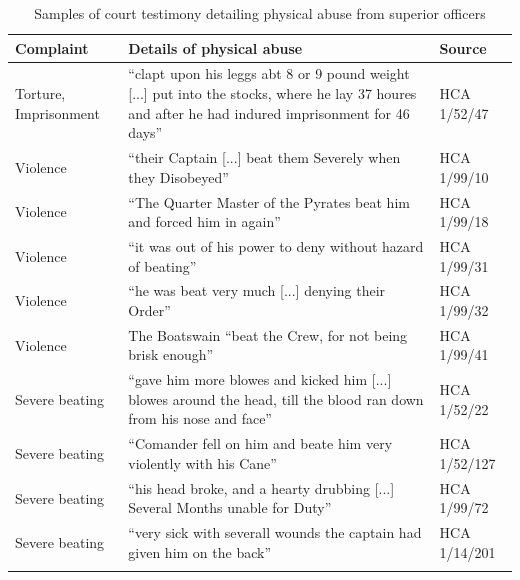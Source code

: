 \begin{table}
\caption{\label{tab:key:4.1} Samples of court testimony detailing physical abuse from superior officers}
\small
\begin{tabularx}{\textwidth}{lQl}
\lsptoprule
\textbf{Complaint} & \textbf{Details} \textbf{of} \textbf{physical} \textbf{abuse} & \textbf{Source}\\
\midrule
Torture, Imprisonment & “clapt upon his leggs abt 8 or 9 pound weight [...] put into the stocks, where he lay 37 houres and after he had indured imprisonment for 46 days” & HCA 1/52/47\\
Violence & “their Captain [...] beat them Severely when they Disobeyed” & HCA 1/99/10\\
Violence & “The Quarter Master of the Pyrates beat him and forced him in again” & HCA 1/99/18\\
Violence & “it was out of his power to deny without hazard of beating” & HCA 1/99/31\\
Violence & “he was beat very much [...] denying their Order” & HCA 1/99/32\\
Violence & The Boatswain “beat the Crew, for not being brisk enough” & HCA 1/99/41\\
Severe beating & “gave him more blowes and kicked him [...] blowes around the head, till the blood ran down from his nose and face” & HCA 1/52/22\\
Severe beating & “Comander fell on him and beate him very violently with his Cane” & HCA 1/52/127\\
Severe beating & “his head broke, and a hearty drubbing [...] Several Months unable for Duty” & HCA 1/99/72\\
Severe beating & “very sick with severall wounds the captain had given him on the back” & HCA 1/14/201\\
\lspbottomrule
\end{tabularx}
\end{table}


